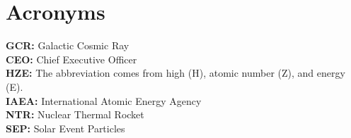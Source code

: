 \chapter*{Acronyms}

\textbf{GCR: } Galactic Cosmic Ray\\
\textbf{CEO: } Chief Executive Officer\\
\textbf{HZE: } The abbreviation comes from high (H), atomic number (Z), and energy (E).\\
\textbf{IAEA: } International Atomic Energy Agency\\
\textbf{NTR: } Nuclear Thermal Rocket\\
\textbf{SEP: } Solar Event Particles\\


\newpage
